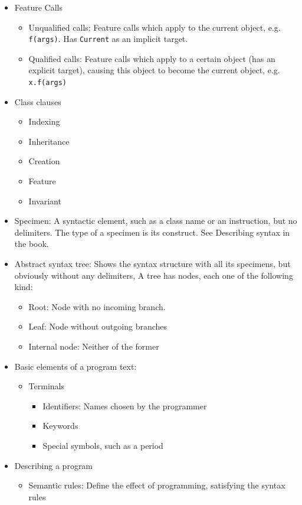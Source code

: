 \documentclass[a4paper]{article}
\newcommand{\inline}[1]{\lstinline!#1!}%
\begin{document}
\begin{itemize}
\item Feature Calls
\begin{itemize}
\item Unqualified calls: Feature calls which apply to the current object, e.g. \inline{f(args)}. Has \inline{Current} as an implicit target.
\item Qualified calls: Feature calls which apply to a certain object (has an explicit target), causing this object to become the current object, e.g. \inline{x.f(args)}
\end{itemize}
\item Class clauses
\begin{itemize}
\item Indexing
\item Inheritance
\item Creation
\item Feature
\item Invariant
\end{itemize}
\item Specimen: A syntactic element, such as a class name or an instruction, but no delimiters. The type of a specimen is its construct. See Describing syntax in the book.
\item Abstract syntax tree: Shows the syntax structure with all its specimens, but obviously without any delimiters, A tree has nodes, each one of the following kind:
\begin{itemize}
\item Root: Node with no incoming branch.
\item Leaf: Node without outgoing branches
\item Internal node: Neither of the former
\end{itemize}
\item Basic elements of a program text:
\begin{itemize}
\item Terminals
\begin{itemize}
\item Identifiers: Names chosen by the programmer
\item Keywords
\item Special symbols, such as a period
\end{itemize}
\end{itemize}
\item Describing a program
\begin{itemize}
\item Semantic rules: Define the effect of programming, satisfying the syntax rules

\end{itemize}
\end{itemize}
\end{document}

